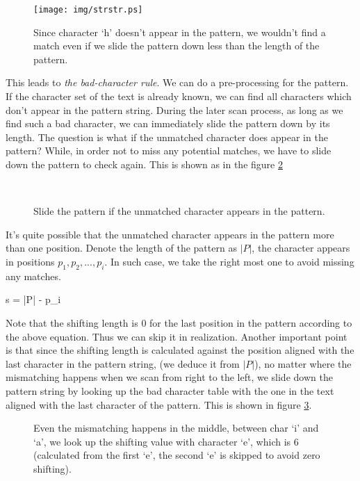 \documentclass[UTF8]{article}
\begin{document}
\begin{figure}[htbp]
 \centering
 \texttt{[image: img/strstr.ps]}
 \caption{Since character `h' doesn't appear in the pattern, we wouldn't find a match even if we slide the pattern
down less than the length of the pattern.}
 \label{fig:bad-char}
\end{figure}

This leads to {\em the bad-character rule}. We can do a pre-processing for the pattern. If the character set
of the text is already known, we can find all characters which don't appear in the pattern string. During the
later scan process, as long as we find such a bad character, we can immediately slide the pattern down by
its length. The question is what if the unmatched character does appear in the pattern? While, in order not to
miss any potential matches, we have to slide down the pattern to check again. This is shown as in the figure \ref{fig:good-char}

\begin{figure}[htbp]
 \centering
  \\
 \caption{Slide the pattern if the unmatched character appears in the pattern.}
 \label{fig:good-char}
\end{figure}

It's quite possible that the unmatched character appears in the pattern more than one position. Denote the
length of the pattern as $|P|$, the character appears in positions $p_1, p_2, ..., p_i$. In such case, we
take the right most one to avoid missing any matches.

\be
s = |P| - p_i
\ee

Note that the shifting length is 0 for the last position in the pattern according to the above
equation. Thus we can skip it in realization.
Another important point is that since the shifting length is calculated against the position aligned
with the last character in the pattern string, (we deduce it from $|P|$), no matter where the
mismatching happens when we scan from right to the left, we slide down the pattern string
by looking up the bad character table with the one in the text aligned with the last
character of the pattern. This is shown in figure \ref{fig:good-char-2}.

\begin{figure}[htbp]
 \centering
 \caption{Even the mismatching happens in the middle, between char `i' and `a', we look up the shifting value with character `e', which is 6 (calculated from the first `e', the second `e' is skipped to avoid zero shifting).}
 \label{fig:good-char-2}
\end{figure}
\end{document}

